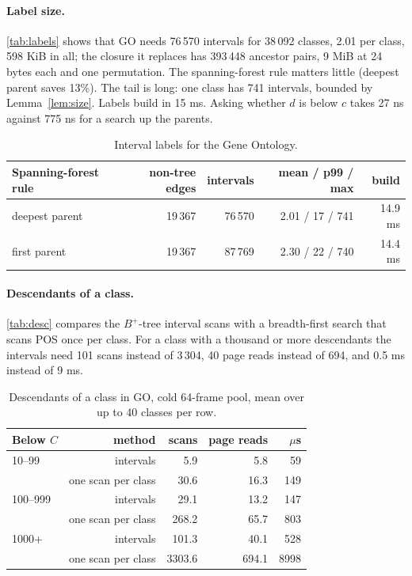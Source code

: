 \documentclass[sigconf, nonacm]{acmart}
\begin{document}
\paragraph{Label size.} \autoref{tab:labels} shows that GO needs 76\,570 intervals for 38\,092 classes, 2.01 per class, 598 KiB in all; the closure it replaces has 393\,448 ancestor pairs, 9 MiB at 24 bytes each and one permutation. The spanning-forest rule matters little (deepest parent saves 13\%). The tail is long: one class has 741 intervals, bounded by Lemma~\ref{lem:size}. Labels build in 15 ms. Asking whether $d$ is below $c$ takes 27 ns against 775 ns for a search up the parents.

\begin{table}[t]
\caption{Interval labels for the Gene Ontology.}
\label{tab:labels}
\small
\begin{tabular}{@{}lrrrr@{}}
\toprule
Spanning-forest rule & non-tree edges & intervals & mean / p99 / max & build \\
\midrule
deepest parent & 19\,367 & 76\,570 & 2.01 / 17 / 741 & 14.9 ms \\
first parent & 19\,367 & 87\,769 & 2.30 / 22 / 740 & 14.4 ms \\
\bottomrule
\end{tabular}
\end{table}

\paragraph{Descendants of a class.} \autoref{tab:desc} compares the $B^+$-tree interval scans with a breadth-first search that scans POS once per class. For a class with a thousand or more descendants the intervals need 101 scans instead of 3\,304, 40 page reads instead of 694, and 0.5 ms instead of 9 ms.

\begin{table}[t]
\caption{Descendants of a class in GO, cold 64-frame pool, mean over up to 40 classes per row.}
\label{tab:desc}
\small
\begin{tabular}{@{}lrrrr@{}}
\toprule
Below $C$ & method & scans & page reads & $\mu$s \\
\midrule
10--99 & intervals & 5.9 & 5.8 & 59 \\
 & one scan per class & 30.6 & 16.3 & 149 \\
100--999 & intervals & 29.1 & 13.2 & 147 \\
 & one scan per class & 268.2 & 65.7 & 803 \\
1000+ & intervals & 101.3 & 40.1 & 528 \\
 & one scan per class & 3303.6 & 694.1 & 8998 \\
\bottomrule
\end{tabular}
\end{table}
\end{document}
